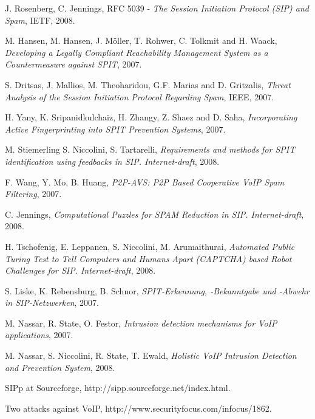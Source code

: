 \documentclass[final
	]{issa}
\begin{document}
\begin{thebibliography}{1}

J. Rosenberg, C. Jennings, RFC 5039 - \emph{The Session Initiation Protocol (SIP) and Spam},
IETF, 2008.

M. Hansen, M. Hansen, J. M\"{o}ller, T. Rohwer, C. Tolkmit and H. Waack,
\emph{Developing a Legally Compliant Reachability Management System as a Countermeasure against SPIT}, 2007.

S. Dritsas, J. Mallios, M. Theoharidou, G.F. Marias and D. Gritzalis,
\emph{Threat Analysis of the Session Initiation Protocol Regarding Spam}, IEEE, 2007.

H. Yany, K. Sripanidkulchaiz, H. Zhangy, Z. Shaez and D. Saha,
\emph{Incorporating Active Fingerprinting into SPIT Prevention Systems}, 2007.

M. Stiemerling S. Niccolini, S. Tartarelli, \emph{Requirements and methods for SPIT identification
using feedbacks in SIP. Internet-draft}, 2008.

F. Wang, Y. Mo, B. Huang, \emph{P2P-AVS: P2P Based Cooperative VoIP Spam Filtering}, 2007.

C. Jennings, \emph{Computational Puzzles for SPAM Reduction in SIP. Internet-draft}, 2008.

H. Tschofenig, E. Leppanen, S. Niccolini, M. Arumaithurai, \emph{Automated Public Turing Test to Tell Computers and Humans Apart (CAPTCHA) based Robot Challenges for SIP. Internet-draft}, 2008.

S. Liske, K. Rebensburg, B. Schnor, \emph{SPIT-Erkennung, -Bekanntgabe und -Abwehr in
SIP-Netzwerken}, 2007.

M. Nassar, R. State, O. Festor, \emph{Intrusion detection mechanisms for VoIP applications}, 2007.

M. Nassar, S. Niccolini, R. State, T. Ewald, \emph{Holistic VoIP Intrusion Detection and Prevention System}, 2008.

SIPp at Sourceforge, http://sipp.sourceforge.net/index.html.

Two attacks against VoIP, http://www.securityfocus.com/infocus/1862.

\end{thebibliography}
\end{document}
